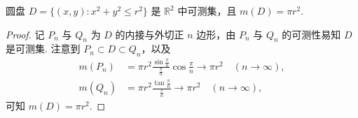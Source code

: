 \documentclass[../../main.tex]{subfiles}%
\begin{document}
\begin{example}
圆盘 \(D = \{ (x,y): x^2 + y^2 \leqslant r^2\}\) 是 \(\mathbb{R}^2\) 中可测集，且 \(m(D)=\pi r^2\).
\end{example}
\begin{proof}
记 \(P_n\) 与 \(Q_n\) 为 \(D\) 的内接与外切正 \(n\) 边形，由 \(P_n\) 与 \(Q_n\) 的可测性易知 \(D\) 是可测集. 注意到 \(P_n \subset D \subset Q_n\)，以及
\begin{align*}
m(P_n) &= \pi r^2 \frac{\sin \frac{\pi}{n}}{\frac{\pi}{n}} \cos\frac{\pi}{n} \to \pi r^2 \quad (n \to \infty),\\
m(Q_n) &= \pi r^2 \frac{\tan\frac{\pi}{n}}{\frac{\pi}{n}} \to \pi r^2 \quad (n \to \infty),
\end{align*}
可知 \(m(D)=\pi r^2\).
\end{proof}
\end{document}
